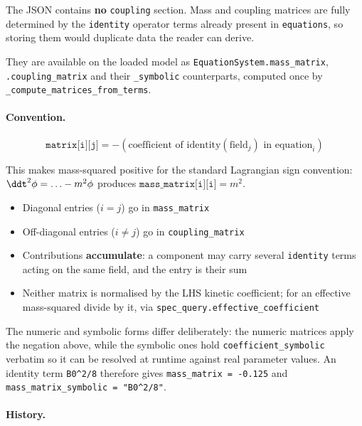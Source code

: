 The JSON contains \textbf{no} \texttt{coupling} section. Mass and coupling
matrices are fully determined by the \texttt{identity} operator terms already
present in \texttt{equations}, so storing them would duplicate data the reader
can derive.

They are available on the loaded model as
\texttt{EquationSystem.mass\_matrix}, \texttt{.coupling\_matrix} and their
\texttt{\_symbolic} counterparts, computed once by
\texttt{\_compute\_matrices\_from\_terms}.

\paragraph{Convention.}
\label{par:json-coupling-convention}

\begin{equation}
  \texttt{matrix[i][j]} = -(\text{coefficient of identity}(\text{field}_j) \text{ in equation}_i)
  \label{eq:matrix-convention}
\end{equation}

This makes mass-squared positive for the standard Lagrangian sign convention:
$\ddt^2 \phi = \ldots - m^2 \phi$ produces $\texttt{mass\_matrix[i][i]} = m^2$.

\begin{itemize}
  \item Diagonal entries ($i = j$) go in \texttt{mass\_matrix}
  \item Off-diagonal entries ($i \neq j$) go in \texttt{coupling\_matrix}
  \item Contributions \textbf{accumulate}: a component may carry several
        \texttt{identity} terms acting on the same field, and the entry is
        their sum
  \item Neither matrix is normalised by the LHS kinetic coefficient; for an
        effective mass-squared divide by it, via
        \texttt{spec\_query.effective\_coefficient}
\end{itemize}

The numeric and symbolic forms differ deliberately: the numeric matrices apply
the negation above, while the symbolic ones hold
\texttt{coefficient\_symbolic} verbatim so it can be resolved at runtime
against real parameter values. An identity term \texttt{B0\^{}2/8} therefore
gives \texttt{mass\_matrix = -0.125} and
\texttt{mass\_matrix\_symbolic = "B0\^{}2/8"}.

\paragraph{History.}
\label{par:json-coupling-history}

